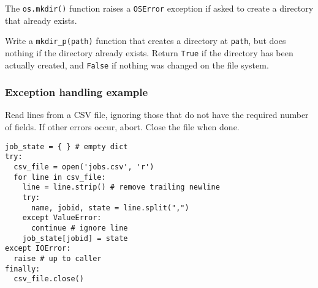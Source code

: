 \documentclass[english,serif,mathserif,xcolor=pdftex,dvipsnames,table]{beamer}
\begin{document}
\begin{frame}
  \begin{exercise}
    The \texttt{os.mkdir()} function raises a \texttt{OSError}
    exception if asked to create a directory that already exists.

    \+ 
    Write a \texttt{mkdir_p(path)} function that creates a
    directory at \texttt{path}, but does nothing if the directory
    already exists.  Return \texttt{True} if the directory has been
    actually created, and \texttt{False} if nothing was changed on the
    file system.
  \end{exercise}
\end{frame}


\begin{frame}[fragile]
  \frametitle{Exception handling example}

Read lines from a CSV file, ignoring those that do not have the
required number of fields.  If other errors occur, abort. 
Close the file when done.
\begin{lstlisting}
job_state = { } # empty dict
try:
  csv_file = open('jobs.csv', 'r')
  for line in csv_file:
    line = line.strip() # remove trailing newline
    try:
      name, jobid, state = line.split(",")
    except ValueError:
      continue # ignore line
    job_state[jobid] = state
except IOError:
  raise # up to caller
finally:
  csv_file.close()
\end{lstlisting}
\end{frame}
\end{document}
